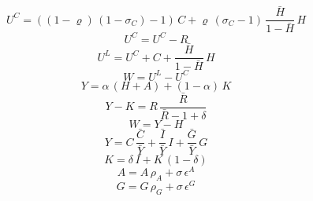 \begin{dmath}
{U^{C}}=\left(\left(1-{{\varrho}}\right)\, \left(1-{{\sigma_{C}}}\right)-1\right)\, {C}+{{\varrho}}\, \left({{\sigma_{C}}}-1\right)\, \frac{{\bar{H}}}{1-{\bar{H}}}\, {H}
\end{dmath}
\begin{dmath}
{U^{C}}={U^{C}}-{R}
\end{dmath}
\begin{dmath}
{U^{L}}={U^{C}}+{C}+\frac{{\bar{H}}}{1-{\bar{H}}}\, {H}
\end{dmath}
\begin{dmath}
{W}={U^{L}}-{U^{C}}
\end{dmath}
\begin{dmath}
{Y}={{\alpha}}\, \left({H}+{A}\right)+\left(1-{{\alpha}}\right)\, {K}
\end{dmath}
\begin{dmath}
{Y}-{K}={R}\, \frac{{\bar{R}}}{{\bar{R}}-1+{{\delta}}}
\end{dmath}
\begin{dmath}
{W}={Y}-{H}
\end{dmath}
\begin{dmath}
{Y}={C}\, {\frac{\bar{C}}{\bar{Y}}}+{\frac{\bar{I}}{\bar{Y}}}\, {I}+{\frac{\bar{G}}{\bar{Y}}}\, {G}
\end{dmath}
\begin{dmath}
{K}={{\delta}}\, {I}+{K}\, \left(1-{{\delta}}\right)
\end{dmath}
\begin{dmath}
{A}={A}\, {{\rho_{A}}}+{{\sigma}}\, {{\epsilon^{A}}}
\end{dmath}
\begin{dmath}
{G}={G}\, {{\rho_{G}}}+{{\sigma}}\, {{\epsilon^{G}}}
\end{dmath}
